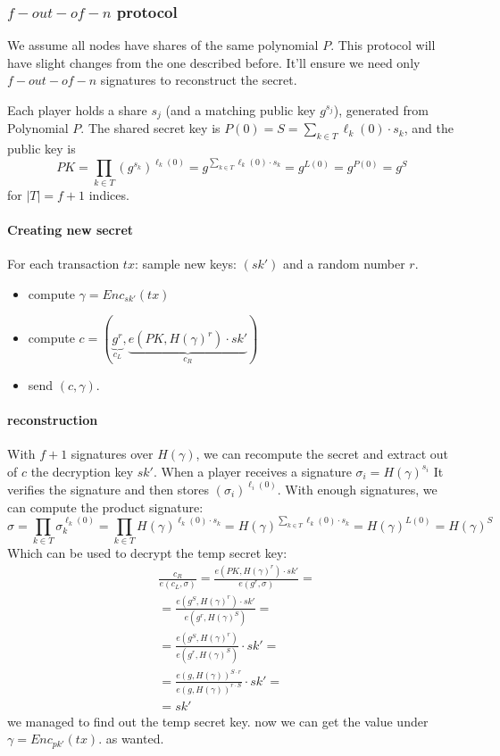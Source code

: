 \subsubsection*{$f-out-of-n$ protocol}
We assume all nodes have shares of the same polynomial $P$.
This protocol will have slight changes from the one described before.
It'll ensure we need only $f-out-of-n$ signatures to reconstruct the secret.


Each player holds a share $s_j$ (and a matching public key $g^{s_j}$), generated from Polynomial $P$. 
The shared secret key is $P(0)= S = \sum_{k \in T}{\ell_k(0)\cdot s_k}$,
and the public key is 
$$
  PK=
  \prod_{k\in T}{(g^{s_k})^{\ell_k(0)}} =
  g^{\sum_{k\in T}{\ell_k(0)\cdot s_k}} =
  g^{L(0)}=g^{P(0)}=g^S 
$$
for $|T|=f+1$ indices.

\paragraph*{Creating new secret}
For each transaction $tx$: sample new keys: $\left(sk'\right)$ and a random number $r$.
\begin{itemize}
\item compute $\gamma=Enc_{sk'}\left(tx\right)$
\item compute $c=\left(\underbrace{g^{r}}_{c_{L}},\underbrace{e\left(PK, H\left(\gamma\right)^{r}\right)\cdot sk'}_{c_{R}}\right)$ 
\item send $\left(c, \gamma\right)$.
\end{itemize}



\paragraph*{reconstruction}


With $f+1$ signatures over $H(\gamma)$, we can recompute the secret and extract out of $c$ the decryption key $sk'$.
When a player receives a signature $\sigma_{i}=H\left(\gamma\right)^{s_{i}}$
It verifies the signature and then stores $ (\sigma_i)^{\ell_i(0)}$.
With enough signatures, we can compute the product signature: $$
\sigma=\prod_{k\in T}{\sigma_k^{\ell_k(0)}} = 
\prod_{k\in T}{H\left(\gamma\right)^{\ell_k(0)\cdot s_{k}}} = 
H\left(\gamma\right)^{\sum_{k\in T}{\ell_k(0)\cdot s_{k}}}=
H\left(\gamma\right)^{L(0)} =
H\left(\gamma\right)^{S}
$$
Which can be used to decrypt the temp secret key: 
\begin{align*}
 & \frac{c_{R}}{e\left(c_{L},\sigma\right)}=\frac{e\left(PK, H\left(\gamma\right)^{r}\right)\cdot sk'}{e\left(g^{r},\sigma\right)}=\\
 & =\frac{e\left(g^S, H\left(\gamma\right)^{r}\right)\cdot sk'}{e\left(g^{r},H(\gamma)^S\right)}=\\
 & =\frac{e\left(g^S, H\left(\gamma\right)^{r}\right)}{e\left(g^{r},H(\gamma)^S\right)} \cdot sk'=\\
 & =\frac{e\left(g, H\left(\gamma\right)\right)^{S\cdot r}}{e\left(g,H(\gamma)\right)^{r\cdot S}} \cdot sk'=\\
 & =sk'
\end{align*}
 we managed to find out the temp secret key. now we can get the value
under $\gamma=Enc_{pk'}\left(tx\right)$. as wanted.

